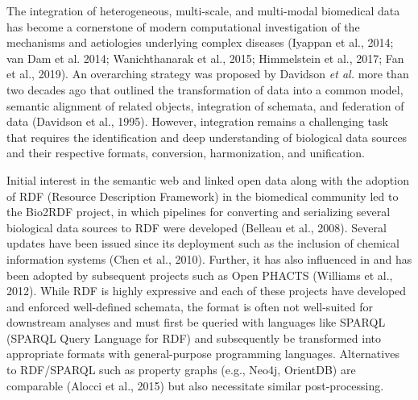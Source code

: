The integration of heterogeneous, multi-scale, and multi-modal biomedical data has become a cornerstone of modern computational investigation of the mechanisms and aetiologies underlying complex diseases (Iyappan et al., 2014; van Dam et al. 2014; Wanichthanarak et al., 2015; Himmelstein et al., 2017; Fan et al., 2019).
An overarching strategy was proposed by Davidson \textit{et al.} more than two decades ago that outlined the transformation of data into a common model, semantic alignment of related objects, integration of schemata, and federation of data (Davidson et al., 1995).
However, integration remains a challenging task that requires the identification and deep understanding of biological data sources and their respective formats, conversion, harmonization, and unification.

Initial interest in the semantic web and linked open data along with the adoption of RDF (Resource Description Framework) in the biomedical community led to the Bio2RDF project, in which pipelines for converting and serializing several biological data sources to RDF were developed (Belleau et al., 2008).
Several updates have been issued since its deployment such as the inclusion of chemical information systems (Chen et al., 2010). Further, it has also influenced in and has been adopted by subsequent projects such as Open PHACTS (Williams et al., 2012).
While RDF is highly expressive and each of these projects have developed and enforced well-defined schemata, the format is often not well-suited for downstream analyses and must first be queried with languages like SPARQL (SPARQL Query Language for RDF) and subsequently be transformed into appropriate formats with general-purpose programming languages.
Alternatives to RDF/SPARQL such as property graphs (e.g., Neo4j, OrientDB) are comparable (Alocci et al., 2015) but also necessitate similar post-processing.

